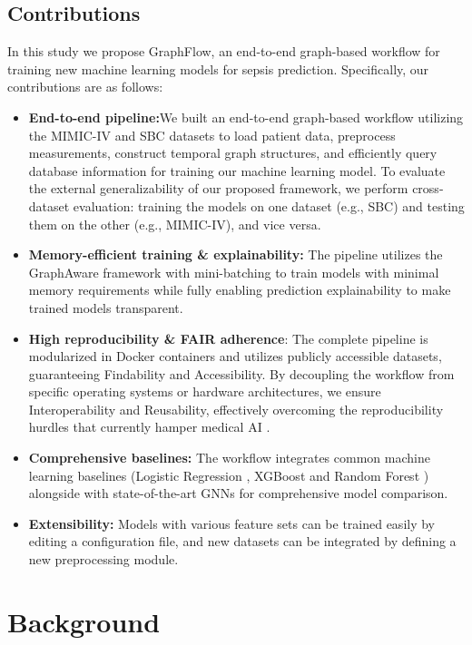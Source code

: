 \documentclass[pdflatex,sn-mathphys-num,lineno]{sn-jnl}
\theoremstyle{thmstyleone}%
\theoremstyle{thmstyletwo}%
\theoremstyle{thmstylethree}%
\begin{document}
\subsection{Contributions}
In this study we propose GraphFlow, an end-to-end graph-based workflow for training new machine learning models for sepsis prediction. Specifically, our contributions are as follows:
\begin{itemize}
    \item \textbf{End-to-end pipeline:}We built an end-to-end graph-based workflow utilizing the MIMIC-IV \cite{johnson2023mimic} and SBC \cite{steinbach2024applying} datasets to load patient data, preprocess measurements, construct temporal graph structures, and efficiently query database information for training our machine learning model. To evaluate the external generalizability of our proposed framework, we perform cross-dataset evaluation: training the models on one dataset (e.g., SBC) and testing them on the other (e.g., MIMIC-IV), and vice versa.
    \item \textbf{Memory-efficient training \& explainability:} The pipeline utilizes the GraphAware framework \cite{walke2026graphaware} with mini-batching to train models with minimal memory requirements while fully enabling prediction explainability to make trained models transparent.
    \item \textbf{High reproducibility \& FAIR adherence}: The complete pipeline is modularized in Docker containers and utilizes publicly accessible datasets, guaranteeing Findability and Accessibility. By decoupling the workflow from specific operating systems or hardware architectures, we ensure Interoperability and Reusability, effectively overcoming the reproducibility hurdles that currently hamper medical AI \cite{Wilkinson2016}.
    \item \textbf{Comprehensive baselines:} The workflow integrates common machine learning baselines (Logistic Regression \cite{wright1995logistic}, XGBoost \cite{Chen2016} and Random Forest \cite{Breiman2001}) alongside with state-of-the-art GNNs for comprehensive model comparison. 
    \item \textbf{Extensibility:} Models with various feature sets can be trained easily by editing a configuration file, and new datasets can be integrated by defining a new preprocessing module.
\end{itemize}

\section{Background}
\end{document}
